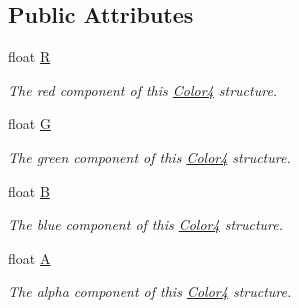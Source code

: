 \subsection*{Public Attributes}
\begin{DoxyCompactItemize}
\item 
float \hyperlink{struct_open_t_k_1_1_graphics_1_1_color4_a5c6bb945ffd883234ed9cea93947b8c4}{R}
\begin{DoxyCompactList}\small\item\em The red component of this \hyperlink{struct_open_t_k_1_1_graphics_1_1_color4}{Color4} structure. \end{DoxyCompactList}\item 
float \hyperlink{struct_open_t_k_1_1_graphics_1_1_color4_a3b12c36dbeeef92ea80dba5dab716d6a}{G}
\begin{DoxyCompactList}\small\item\em The green component of this \hyperlink{struct_open_t_k_1_1_graphics_1_1_color4}{Color4} structure. \end{DoxyCompactList}\item 
float \hyperlink{struct_open_t_k_1_1_graphics_1_1_color4_a6c305a3340d060eb289f016ec92381c7}{B}
\begin{DoxyCompactList}\small\item\em The blue component of this \hyperlink{struct_open_t_k_1_1_graphics_1_1_color4}{Color4} structure. \end{DoxyCompactList}\item 
float \hyperlink{struct_open_t_k_1_1_graphics_1_1_color4_aab0da6a29661ca8b86a2325024cb4d6d}{A}
\begin{DoxyCompactList}\small\item\em The alpha component of this \hyperlink{struct_open_t_k_1_1_graphics_1_1_color4}{Color4} structure. \end{DoxyCompactList}\end{DoxyCompactItemize}
